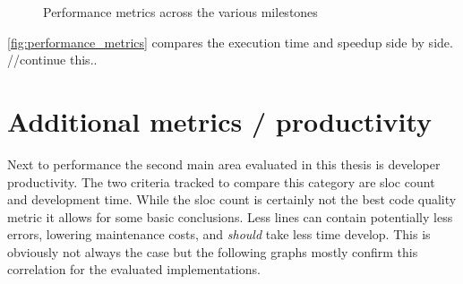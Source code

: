 \begin{figure}[htb]
{{
        }
    }
    \caption{Performance metrics across the various milestones}
    \label{fig:performance_metrics}
\end{figure}

\autoref{fig:performance_metrics} compares the execution time and speedup side by side. //continue this..

\section{Additional metrics / productivity}
\label{sec:Evaluation::Metrics}

Next to performance the second main area evaluated in this thesis is developer productivity. The two criteria tracked to compare this category are \gls{sloc} count and development time. While the \gls{sloc} count is certainly not the best code quality metric it allows for some basic conclusions. Less lines can contain potentially less errors, lowering maintenance costs, and \textit{should} take less time develop. This is obviously not always the case but the following graphs mostly confirm this correlation for the evaluated implementations.

